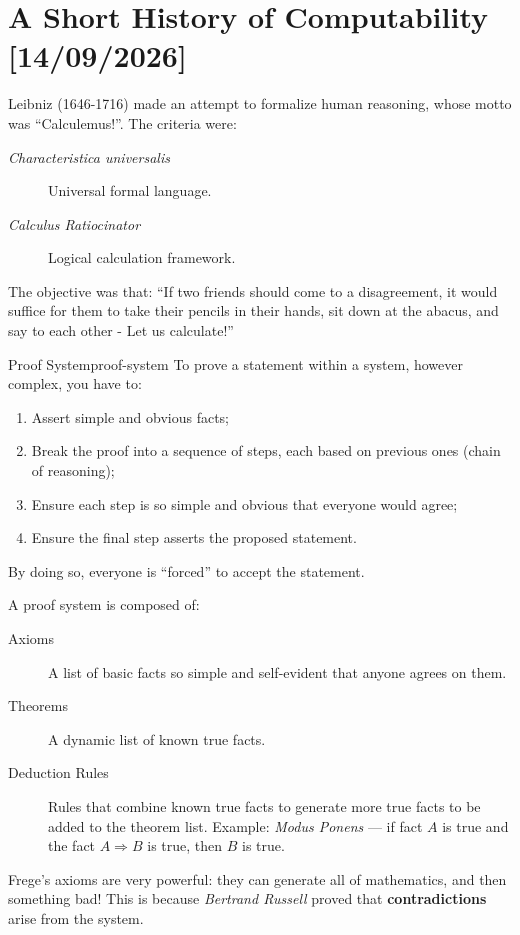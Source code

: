 \chapter{A Short History of Computability [14/09/2026]}

Leibniz (1646-1716) made an attempt to formalize human reasoning, whose motto was ``Calculemus!''. The criteria were:
\begin{description}
    \item[\textit{Characteristica universalis}] Universal formal language.
    \item[\textit{Calculus Ratiocinator}] Logical calculation framework. 
\end{description}
The objective was that: ``If two friends should come to a disagreement, it would suffice for them to take their pencils in their hands, sit down at the abacus, and say to each other - Let us calculate!''

\begin{definition}{Proof System}{proof-system}
    To prove a statement within a system, however complex, you have to:
    \begin{enumerate}
        \item Assert simple and obvious facts;
        \item Break the proof into a sequence of steps, each based on previous ones (chain of reasoning);
        \item Ensure each step is so simple and obvious that everyone would agree;
        \item Ensure the final step asserts the proposed statement.
    \end{enumerate}
    By doing so, everyone is ``forced'' to accept the statement.
\end{definition}

A proof system is composed of:
\begin{description}
    \item[Axioms] A list of basic facts so simple and self-evident that anyone agrees on them. 
    \item[Theorems] A dynamic list of known true facts.
    \item[Deduction Rules] Rules that combine known true facts to generate more true facts to be added to the theorem list.
        \subitem Example: \textit{Modus Ponens} --- if fact \(A\) is true and the fact \(A\Rightarrow B\) is true, then \(B\) is true.
\end{description}

Frege's axioms are very powerful: they can generate all of mathematics, and then something bad!
This is because \textit{Bertrand Russell} proved that \textbf{contradictions} arise from the system.

